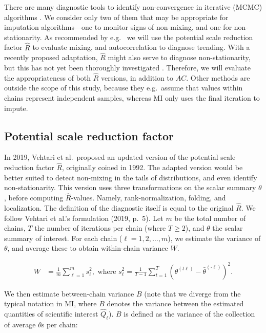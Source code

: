 \documentclass[Royal,times,sageh]{sagej}
\begin{document}
There are many diagnostic tools to identify non-convergence in iterative (MCMC) algorithms \citep{broo98, elad06}. We consider only two of them that may be appropriate for imputation algorithms---one to monitor signs of non-mixing, and one for non-stationarity. As recommended by e.g.~\citet{cowl96} we will use the potential scale reduction factor \(\widehat{R}\) \citep[`Gelman-Rubin statistic';][]{gelm92} to evaluate mixing, and autocorrelation \citep[\(AC\);][]{scha97, gelm13} to diagnose trending. With a recently proposed adaptation, \(\widehat{R}\) might also serve to diagnose non-stationarity, but this has not yet been thoroughly investigated \citep{veht19}. Therefore, we will evaluate the appropriateness of both \(\widehat{R}\) versions, in addition to \(AC\). Other methods are outside the scope of this study, because they e.g.~assume that values within chains represent independent samples, whereas MI only uses the final iteration to impute.

\hypertarget{potential-scale-reduction-factor}{%
\subsection{Potential scale reduction factor}\label{potential-scale-reduction-factor}}

In 2019, Vehtari et al.~proposed an updated version of the potential scale reduction factor \(\widehat{R}\), originally coined in 1992. The adapted version would be better suited to detect non-mixing in the tails of distributions, and even identify non-stationarity. This version uses three transformations on the scalar summary \(\theta\), before computing \(\widehat{R}\)-values. Namely, rank-normalization, folding, and localization. The definition of the diagnostic itself is equal to the original \(\widehat{R}\). We follow Vehtari et al.'s formulation (2019, p.~5). Let \(m\) be the total number of chains, \(T\) the number of iterations per chain (where \(T\geq2\)), and \(\theta\) the scalar summary of interest. For each chain (\(\ell = 1, 2, \dots, m\)), we estimate the variance of \(\theta\), and average these to obtain within-chain variance \(W\).

\begin{align*}
W&=\frac{1}{m} \sum_{\ell=1}^{m} s_{\ell}^{2}, \text { where } s_{\ell}^{2}=\frac{1}{T-1} \sum_{t=1}^{T}\left(\theta^{(t \ell)}-\bar{\theta}^{(\cdot \ell)}\right)^{2}. 
\end{align*}

\noindent We then estimate between-chain variance \(B\) (note that we diverge from the typical notation in MI, where \(B\) denotes the variance between the estimated quantities of scientific interest \(\hat{Q}_{\ell}\)). \(B\) is defined as the variance of the collection of average \(\theta\)s per chain:
\end{document}
